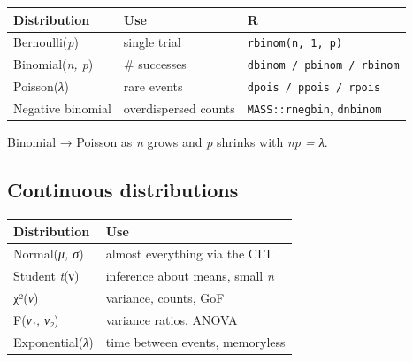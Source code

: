 \documentclass[
]{article}
\newcounter{none} %
\begin{document}
{\def\LTcaptype{none} %
\begin{longtable}[]{@{}
  >{\raggedright\arraybackslash}p{}
  >{\raggedright\arraybackslash}p{}
  >{\raggedright\arraybackslash}p{}@{}}
\toprule\noalign{}
\begin{minipage}[b]{\linewidth}\raggedright
Distribution
\end{minipage} & \begin{minipage}[b]{\linewidth}\raggedright
Use
\end{minipage} & \begin{minipage}[b]{\linewidth}\raggedright
R
\end{minipage} \\
\midrule\noalign{}
\endhead
\bottomrule\noalign{}
\endlastfoot
Bernoulli(\emph{p}) & single trial & \texttt{rbinom(n,\ 1,\ p)} \\
Binomial(\emph{n, p}) & \# successes &
\texttt{dbinom\ /\ pbinom\ /\ rbinom} \\
Poisson(\emph{λ}) & rare events & \texttt{dpois\ /\ ppois\ /\ rpois} \\
Negative binomial & overdispersed counts & \texttt{MASS::rnegbin},
\texttt{dnbinom} \\
\end{longtable}
}

Binomial → Poisson as \emph{n} grows and \emph{p} shrinks with \emph{np
= λ}.

\subsection{Continuous distributions}\label{continuous-distributions}

{\def\LTcaptype{none} %
\begin{longtable}[]{@{}ll@{}}
\toprule\noalign{}
Distribution & Use \\
\midrule\noalign{}
\endhead
\bottomrule\noalign{}
\endlastfoot
Normal(\emph{μ, σ}) & almost everything via the CLT \\
Student \emph{t}(ν) & inference about means, small \emph{n} \\
χ²(\emph{ν}) & variance, counts, GoF \\
F(\emph{ν₁, ν₂}) & variance ratios, ANOVA \\
Exponential(\emph{λ}) & time between events, memoryless \\
\end{longtable}
}
\end{document}
